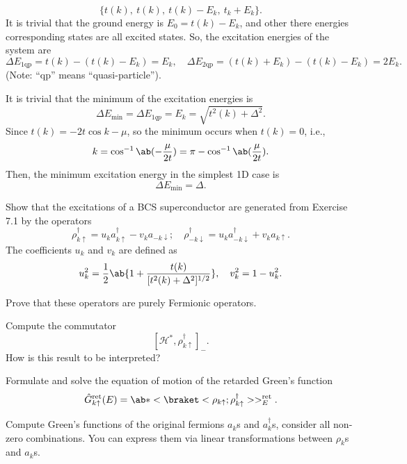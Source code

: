\begin{solution}
\begin{enumext}
    \[
      \{t(k),\ t(k),\ t(k) - E_k,\ t_k + E_k\}.
    \]
    It is trivial that the ground energy is $E_0 = t(k) - E_k$, and other there
    energies corresponding states are all excited states. So, the excitation
    energies of the system are
    \[
      \Delta E_\text{1qp} = t(k) - (t(k) - E_k) = E_k, \quad
      \Delta E_\text{2qp} = (t(k) + E_k) - (t(k) - E_k) = 2E_k.
    \]
    (Note: ``qp'' means ``quasi-particle'').
    \item It is trivial that the minimum of the excitation energies is
    \[
      \Delta E_{\min} = \Delta E_{1qp} = E_k = \sqrt{t^2(k) + \Delta^2}.
    \]
    Since $t(k) = -2t\cos k - \mu$, so the minimum occurs when $t(k) = 0$,
    i.e.,
    \[
      k = \cos^{-1}\ab(-\frac{\mu}{2t}) = \pi - \cos^{-1}\ab(\frac{\mu}{2t}).
    \]
    Then, the minimum excitation energy in the simplest 1D case is
    \[
      \Delta E_{\min} = \Delta.
    \]
  \end{enumext}
\end{solution}
\newpage
\begin{problem}
  \begin{enumext}\leavevmode
    \item Show that the excitations of a BCS superconductor are generated from
    Exercise 7.1 by the operators
    \[
      \rho_{k\uparrow}^\dagger
    = u_k a_{k\uparrow}^\dagger - v_k a_{-k\downarrow}; \quad
      \rho_{-k\downarrow}^\dagger
    = u_k a_{-k\downarrow}^\dagger + v_k a_{k\uparrow}.
    \]
    The coefficients $u_k$ and $v_k$ are defined as
    \[
      u_k^2 = \frac12 \ab\{1 + \frac{t(k)}{[t^2(k) + \Delta^2]^{1/2}}\}, \quad
      v_k^2 = 1 - u_k^2.
    \]
    \item Prove that these operators are purely Fermionic operators.
    \item Compute the commutator
    \[
      [\mathcal H^*, \rho_{k\uparrow}^\dagger]_-.
    \]
    How is this result to be interpreted?
    \item Formulate and solve the equation of motion of the retarded Green's
    function
    \[
      \hat G_{k\uparrow}^\text{ret}(E)
    = \ab*<\braket<\rho_{k\uparrow};\rho_{k\uparrow}^\dagger>>_E^\text{ret}.
    \]
    \item Compute Green's functions of the original fermions $a_k$s and
    $a_k^\dagger$s, consider all non-zero combinations. You can express them
    via linear transformations between $\rho_k$s and $a_k$s.
  \end{enumext}
\end{problem}
